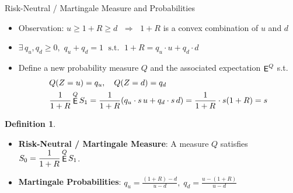 \documentclass[10pt]{beamer}
\newcommand{\ds}{\displaystyle}
\newcommand{\ie}{\;\Longrightarrow\;}
\newcommand{\ifff}{\;\Longleftrightarrow\;}
\DeclareMathOperator\expc{{\sf E}}
\theoremstyle{definition}
\newtheorem*{dfn}{Definition}
\newtheorem*{thm}{Theorem}
\begin{document}

\begin{frame}{Risk-Neutral / Martingale Measure and Probabilities}
  \begin{itemize}
    \item Observation: $u\geqslant 1+R \geqslant d$ $\ie$ $1 + R$ is a convex combination of $u$ and $d$  
    \item $\ds\exists\,q_u, q_d \geqslant 0,\,\,q_u+q_d = 1\;\text{ s.t. }\; 1 + R = q_u\cdot u + q_d\cdot d$
    \item Define a new probability measure $Q$ and the associated expectation $\expc^Q$ s.t. 
      \begin{align*}
        &Q(Z = u) = q_u,\quad Q(Z = d) = q_d \\
        &\frac{1}{1+R}\expc^Q S_1 = \frac{1}{1+R}(q_u\cdot s\,u + q_d\cdot s\,d) = \frac{1}{1+R}\cdot s(1+R) = s
      \end{align*}
  \end{itemize}
  \begin{dfn}
    \begin{itemize}
      \item \textbf{Risk-Neutral / Martingale Measure}: A measure $Q$ satisfies $\ds S_0 = \frac{1}{1+R}\expc^Q S_1$.
      \item \textbf{Martingale Probabilities}: $\ds q_u = \frac{(1+R)-d}{u-d}, \;q_d = \frac{u-(1+R)}{u-d}$
    \end{itemize}
  \end{dfn}
\end{frame}
\end{document}
